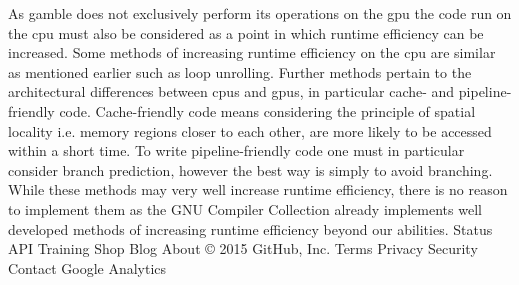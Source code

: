 As \gls{gamble} does not exclusively perform its operations on the \acrshort{gpu} the code run on the \acrshort{cpu} must also be considered as a point in which runtime efficiency can be increased.
Some methods of increasing runtime efficiency on the \acrshort{cpu} are similar as mentioned earlier such as loop unrolling.
Further methods pertain to the architectural differences between \acrshort{cpu}s and \acrshort{gpu}s, in particular cache- and pipeline-friendly code.
Cache-friendly code means considering the principle of spatial locality i.e. memory regions closer to each other, are more likely to be accessed within a short time.
To write pipeline-friendly code one must in particular consider branch prediction, however the best way is simply to avoid branching. \citep{CCodeOpt}
While these methods may very well increase runtime efficiency, there is no reason to implement them as the GNU Compiler Collection already implements well developed methods of increasing runtime efficiency beyond our abilities.
Status API Training Shop Blog About
© 2015 GitHub, Inc. Terms Privacy Security Contact
Google Analytics